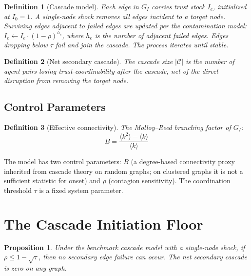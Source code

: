 \documentclass[11pt,a4paper]{article}
\newtheorem{proposition}{Proposition}
\newtheorem{definition}{Definition}
\begin{document}
\begin{definition}[Cascade model]
Each edge in $G_I$ carries trust stock $I_e$, initialized at $I_0 = 1$. A single-node shock removes all edges incident to a target node. Surviving edges adjacent to failed edges are updated per the contamination model: $I_e \leftarrow I_e \cdot (1-\rho)^{h_e}$, where $h_e$ is the number of adjacent failed edges. Edges dropping below $\tau$ fail and join the cascade. The process iterates until stable.
\end{definition}

\begin{definition}[Net secondary cascade]
The cascade size $|\mathcal{C}|$ is the number of agent pairs losing trust-coordinability after the cascade, \emph{net of} the direct disruption from removing the target node.
\end{definition}

\subsection{Control Parameters}

\begin{definition}[Effective connectivity]
The Molloy--Reed branching factor of $G_I$:
\begin{equation}
B = \frac{\langle k^2 \rangle - \langle k \rangle}{\langle k \rangle}
\label{eq:branching}
\end{equation}
\end{definition}

The model has two control parameters: $B$ (a degree-based connectivity proxy inherited from cascade theory on random graphs; on clustered graphs it is not a sufficient statistic for onset) and $\rho$ (contagion sensitivity). The coordination threshold $\tau$ is a fixed system parameter.



\section{The Cascade Initiation Floor}

\begin{proposition}
Under the benchmark cascade model with a single-node shock, if $\rho \leq 1 - \sqrt{\tau}$, then no secondary edge failure can occur. The net secondary cascade is zero on any graph.
\end{proposition}
\end{document}
